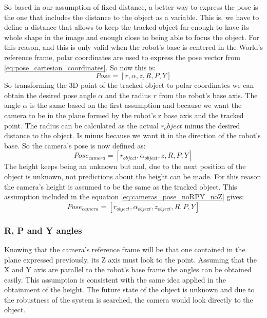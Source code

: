 	So based in our assumption of fixed distance, a better way to express the pose is the one that includes the distance to the object as a variable.  
	This is, we have to define a distance that allows to keep the tracked object far enough to have its whole shape in the image and enough close to being able to focus the object.
	For this reason, and this is only valid when the robot's base is centered in the World's reference frame, polar coordinates are used to express the pose vector from \ref{eq:pose_cartesian_coordinates}. So now this is:
		\begin{equation}
		\label{eq:pose_polar_coorinates}
			Pose = [r,\alpha,z,R,P,Y]
		\end{equation}
	So transforming the 3D point of the tracked object to polar coordinates we can obtain the desired pose angle $\alpha$ and the radius $r$ from the robot's base axis. 
	The angle $\alpha$ is the same based on the first assumption and because we want the camera to be in the plane formed by the robot's z base axis and the tracked point. 
	The radius can be calculated as the actual $r_object$ minus the desired distance to the object. Is minus because we want it in the direction of the robot's base. 
	So the camera's pose is now defined as:
		\begin{equation}
		\label{eq:cameras_pose_noRPY_noZ}
			Pose_{camera} = [r_{object},\alpha_{object},z,R,P,Y]
		\end{equation}
	The height keeps being an unknown but and, due to the next position of the object is unknown, not predictions about the height can be made. 
	For this reason the camera's height is assumed to be the same as the tracked object. This assumption included in the equation \ref{eq:cameras_pose_noRPY_noZ} gives:
		\begin{equation}
			\label{eq:cameras_pose_noRPY}
			Pose_{camera} = [r_{object},\alpha_{object},z_{object},R,P,Y]
		\end{equation}
	\subsubsection{R, P and Y angles} %
	\label{subsub:r_p_and_y_angles}
	Knowing that the camera's reference frame will be that one contained in the plane expressed previously, its Z axis must look to the point. 
	Assuming that the X and Y axis are parallel to the robot's base frame the angles can be obtained easily.
	This assumption is consistent with the same idea applied in the obtainment of the height. 
	The future state of the object is unknown and due to the robustness of the system is searched, the camera would look directly to the object.\\

